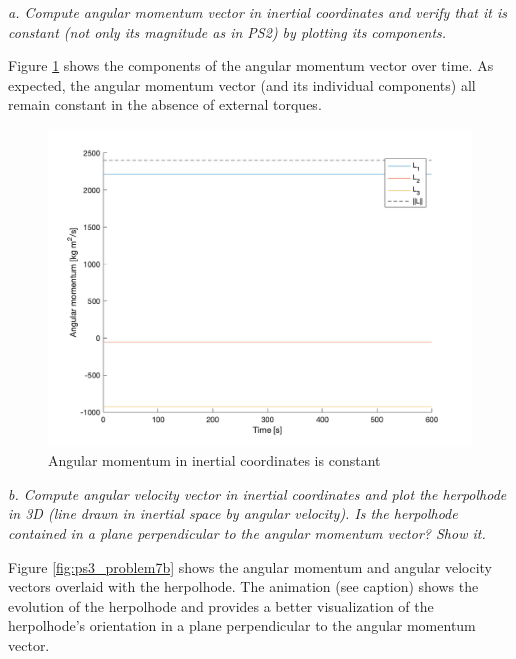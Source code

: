 \textit{a. Compute angular momentum vector in inertial coordinates and verify that it is constant (not only its magnitude as in PS2) by plotting its components.}

Figure \ref{fig:ps3_problem7a} shows the components of the angular momentum vector over time. As expected, the angular momentum vector (and its individual components) all remain constant in the absence of external torques.

\begin{figure}[H]
\centering
\includegraphics[scale=0.6]{Images/ps3_problem7a.png}
\caption{Angular momentum in inertial coordinates is constant}
\label{fig:ps3_problem7a}
\end{figure}

\textit{b. Compute angular velocity vector in inertial coordinates and plot the herpolhode in 3D (line drawn in inertial space by angular velocity). Is the herpolhode contained in a plane perpendicular to the angular momentum vector? Show it.}

Figure \ref{fig:ps3_problem7b} shows the angular momentum and angular velocity vectors overlaid with the herpolhode. The animation (see caption) shows the evolution of the herpolhode and provides a better visualization of the herpolhode's orientation in a plane perpendicular to the angular momentum vector. 

